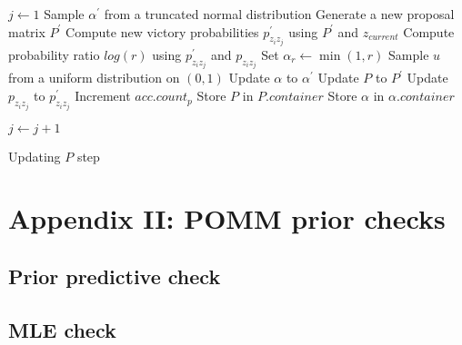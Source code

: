 \documentclass[11pt]{amsart}
\begin{document}
\begin{algorithm}
\begin{algorithmic}[1]
\State $j \gets 1$
\State Sample $\alpha^{\prime}$ from a truncated normal distribution
\State Generate a new proposal matrix $P^{\prime}$
\State Compute new victory probabilities $p_{z_iz_j}^{\prime}$ using $P^{\prime}$ and $z_{current}$
\State Compute probability ratio $log(r)$ using $p_{z_iz_j}^{\prime}$ and $p_{z_iz_j}$
\State Set $\alpha_{r} \gets \min(1, r)$
\State Sample $u$ from a uniform distribution on $(0,1)$
\State Update $\alpha$ to $\alpha^{\prime}$
\State Update $P$ to $P^{\prime}$
\State Update $p_{z_iz_j}$ to $p_{z_iz_j}^{\prime}$
\State Increment $acc.count_{p}$
\EndIf
\State Store $P$ in $P.container$
\State Store $\alpha$ in $\alpha.container$

\State $j \gets j+1$
\EndWhile
\end{algorithmic}
\label{alg:P_update}
\caption{Updating $P$ step}
\end{algorithm}

\section{Appendix II: POMM prior checks}

\subsection{Prior predictive check}

\subsection{MLE check}
\end{document}
